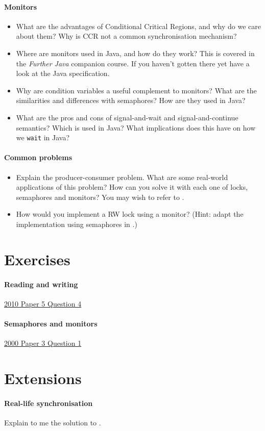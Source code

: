 \documentclass[12pt,a4paper,oneside,openright]{report}
\newcommand{\question}[2]{\paragraph{#1} #2}
\begin{document}
\question{Monitors}{
  \begin{itemize}
  \item What are the advantages of Conditional Critical Regions, and
    why do we care about them? Why is CCR not a common synchronisation
    mechanism?
  \item Where are monitors used in Java, and how do they work? This is
    covered in the \emph{Further Java} companion course. If you
    haven't gotten there yet have a look at the Java specification.
  \item Why are condition variables a useful complement to monitors?
    What are the similarities and differences with semaphores? How are
    they used in Java?
  \item What are the pros and cons of signal-and-wait and
    signal-and-continue semantics? Which is used in Java? What
    implications does this have on how we \texttt{wait} in Java?
  \end{itemize}
}

\question{Common problems}{
  \begin{itemize}
  \item Explain the producer-consumer problem. What are some
    real-world applications of this problem? How can you solve it with
    each one of locks, semaphores and monitors? You may wish to
    refer to \cite[Chapter~11.3]{bacon2003operating}.
  \item How would you implement a RW lock using a monitor? (Hint:
    adapt the implementation using semaphores in
    \cite[Chapter~11.5]{bacon2003operating}.)
  \end{itemize}
}

\section{Exercises}

\question{Reading and
  writing}{\href{https://www.cl.cam.ac.uk/teaching/exams/pastpapers/y2010p5q4.pdf}{2010
    Paper 5 Question 4}}

\question{Semaphores and
  monitors}{\href{https://www.cl.cam.ac.uk/teaching/exams/pastpapers/y2000p3q1.pdf}{2000
    Paper 3 Question 1}}

\section{Extensions}

\question{Real-life synchronisation}{Explain to me the solution to
  \cite[Chapter~1,~Exercise~4]{ArtMultiprocessorProgramming}.}
\end{document}
